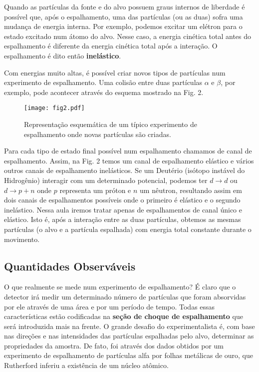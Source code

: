 \documentclass{article}
\begin{document}
Quando as partículas da fonte e do alvo possuem graus internos de liberdade é possível que, após o espalhamento, uma das partículas (ou as duas) sofra uma mudança de energia interna. Por exemplo, podemos excitar um elétron para o estado excitado num átomo do alvo. Nesse caso, a energia cinética total antes do espalhamento é diferente da energia cinética total após a interação. O espalhamento é dito então \textbf{inelástico}.

Com energias muito altas, é possível criar novos tipos de partículas num experimento de espalhamento. Uma colisão entre duas partículas $\alpha$ e $\beta$, por exemplo, pode acontecer através do esquema mostrado na Fig. 2.

\begin{figure}[h]
\centering
\texttt{[image: fig2.pdf]}
\caption{Representação esquemática de um típico experimento de espalhamento onde novas partículas são criadas. }
\end{figure}

\noindent Para cada tipo de estado final possível num espalhamento chamamos de canal de espalhamento. Assim, na Fig. 2 temos um canal de espalhamento elástico e vários outros canais de espalhamento inelásticos. Se um Deutério (isótopo instável do Hidrogênio) interagir com um determinado potencial, podemos ter $d\rightarrow d$ ou $d\rightarrow p+n$ onde $p$ representa um próton e $n$ um nêutron, resultando assim em dois canais de espalhamentos possíveis onde o primeiro é elástico e o segundo inelástico. Nessa aula iremos tratar apenas de espalhamentos de canal único e elástico. Isto é, após a interação entre as duas partículas, obtemos as mesmas partículas (o alvo e a partícula espalhada) com energia total constante durante o movimento.

\subsection{Quantidades Observáveis}

O que realmente se mede num experimento de espalhamento? É claro que o detector irá medir um determinado número de partículas que foram absorvidas por ele através de uma área e por um período de tempo. Todas essas características estão codificadas na \textbf{seção de choque de espalhamento} que será introduzida mais na frente. O grande desafio do experimentalista é, com base nas direções e nas intensidades das partículas espalhadas pelo alvo, determinar as propriedades da amostra. De fato, foi através dos dados obtidos por um experimento de espalhamento de partículas alfa por folhas metálicas de ouro, que Rutherford inferiu a existência de um núcleo atômico.
\end{document}
